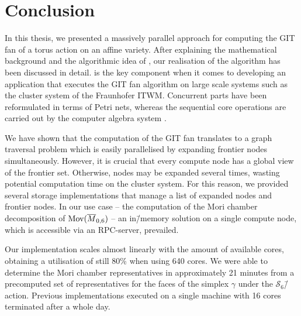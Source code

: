 \chapter{Conclusion}

In this thesis, we presented a massively parallel approach for computing the GIT fan of a torus action on an affine variety. After explaining the mathematical background and the algorithmic idea of \citeauthor{gitfan_symmetry}, our realisation of the algorithm has been discussed in detail. \gpispace{} is the key component when it comes to developing an application that executes the GIT fan algorithm on large scale systems such as the cluster system of the \ac{Fraunhofer ITWM}. Concurrent parts have been reformulated in terms of Petri nets, whereas the sequential core operations are carried out by the computer algebra system \singular{}.

We have shown that the computation of the GIT fan translates to a graph traversal problem which is easily parallelised by expanding frontier nodes simultaneously. However, it is crucial that every compute node has a global view of the frontier set. Otherwise, nodes may be expanded several times, wasting potential computation time on the cluster system. For this reason, we provided several storage implementations that manage a list of expanded nodes and frontier nodes. In our use case -- the computation of the Mori chamber decomposition of $\text{Mov}(\overline{M}_{0,6})$ -- an in\=/memory solution on a single compute node, which is accessible via an RPC-server, prevailed.

Our implementation scales almost linearly with the amount of available cores, obtaining a utilisation of still 80\% when using 640 cores. We were able to determine the Mori chamber representatives in approximately 21 minutes from a precomputed set of representatives for the faces of the simplex $\gamma$ under the $\mathcal{S}_6$\=/action. Previous implementations executed on a single machine with 16 cores terminated after a whole day. \cite[Rermark 6.8]{gitfan_symmetry}

